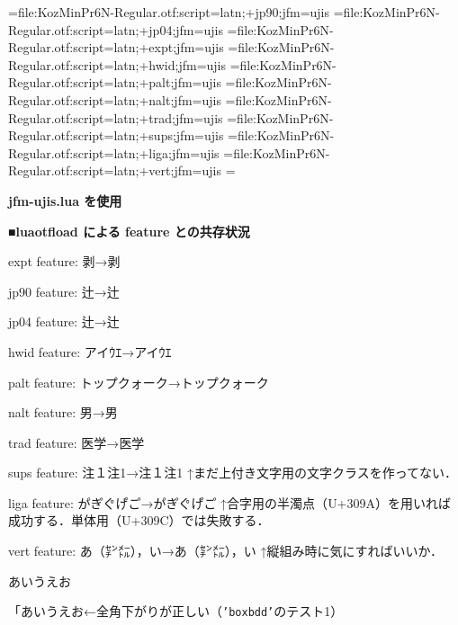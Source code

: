 

\jfont\jisninety={file:KozMinPr6N-Regular.otf:script=latn;+jp90;jfm=ujis}
\jfont\jisfour={file:KozMinPr6N-Regular.otf:script=latn;+jp04;jfm=ujis}
\jfont\jisexpt={file:KozMinPr6N-Regular.otf:script=latn;+expt;jfm=ujis}
\jfont\jishwid={file:KozMinPr6N-Regular.otf:script=latn;+hwid;jfm=ujis}
\jfont\jispalt={file:KozMinPr6N-Regular.otf:script=latn;+palt;jfm=ujis}
\jfont\jisnalt={file:KozMinPr6N-Regular.otf:script=latn;+nalt;jfm=ujis}
\jfont\jistrad={file:KozMinPr6N-Regular.otf:script=latn;+trad;jfm=ujis}
\jfont\jissups={file:KozMinPr6N-Regular.otf:script=latn;+sups;jfm=ujis}
\jfont\jisliga={file:KozMinPr6N-Regular.otf:script=latn;+liga;jfm=ujis}
\jfont\jisvert={file:KozMinPr6N-Regular.otf:script=latn;+vert;jfm=ujis}
\parskip=\smallskipamount{}\zw

{\noindent\bf\tengt jfm-ujis.lua を使用}

\bigskip

{\noindent\bf\tengt ■luaotf\/load による feature との共存状況}

{\tentt expt} feature: 剥→{\jisexpt 剥}

{\tentt jp90} feature: 辻→{\jisninety 辻}

{\tentt jp04} feature: 辻→{\jisfour 辻}

{\tentt hwid} feature: アイｳｴ→{\jishwid アイｳｴ}

{\tentt palt} feature: トップクォーク→{\jispalt トップクォーク}\hfil\break

{\tentt nalt} feature: 男→{\jisnalt 男}

{\tentt trad} feature: 医学→{\jistrad 医学}

{\tentt sups} feature: 注１注1→{\jissups 注１注1}\hfil\break
↑まだ上付き文字用の文字クラスを作ってない．

{\tentt liga} feature: か゚き゚く゚け゚こ゚→{\jisliga か゚き゚く゚け゚こ゚}\hfil\break
↑合字用の半濁点（{\tentt U+309A}）を用いれば成功する．単体用（{\tentt U+309C}）では失敗する．%

{\tentt vert} feature: あ（㌢㍍），い→{\jisvert あ（㌢㍍），い}\hfil\break
↑縦組み時に気にすればいいか．

\bigskip

\noindent あいうえお

「あいうえお←全角下がりが正しい（{\tt'boxbdd'}のテスト1）

